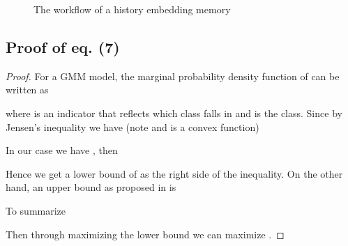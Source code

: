 \documentclass[11pt]{article}
\begin{document}
\begin{figure}[ht]

\caption{The workflow of a history embedding memory}
\label{workflow}
\end{figure}

\subsection{Proof of eq. (7)}

\begin{proof}
    For a GMM model, the marginal probability density function of  can be written as
    
    where  is an indicator that reflects which class  falls in and  is the  class. Since  by Jensen's inequality we have (note  and  is a convex function)
    
    In our case we have , then
    
    Hence we get a lower bound of  as the right side of the inequality. On the other hand, an upper bound as proposed in \citet{huber2008entropy} is
    
    To summarize
    
    Then through maximizing the lower bound  we can maximize .
\end{proof} 
\end{document}
